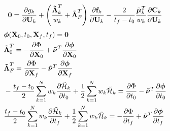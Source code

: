 \documentclass[10pt,final]{report}
\begin{document}
\begin{eqnarray}
  & \textbf{0} = \displaystyle\frac{\partial g_k}{\partial
    \textbf{U}_k} + \left(\frac{\boldsymbol{\tilde\Lambda}_k^T}{w_k} +
    \boldsymbol{\tilde \Lambda}^T_F \right)  \frac{\partial
    \textbf{f}_k}{\partial \textbf{U}_k} -
  \frac{2}{t_f-t_0}\frac{\tilde{\boldsymbol{\mu}}_{k}^T}{w_k}
  \frac{\partial \textbf{C}_{k}}{\partial \textbf{U}_k}  &
    \vspace{6pt}
\end{eqnarray}
\begin{eqnarray}
  \label{kkt 4}
  & \boldsymbol{\phi}(\textbf{X}_0,t_0,\textbf{X}_f,t_f) = \textbf{0}
  & \vspace{6pt}\\
  & \boldsymbol{\tilde \Lambda}_0^T = -\displaystyle\frac{\partial
    \Phi}{\partial \textbf{X}_0} + \boldsymbol{\tilde\nu}^T
  \displaystyle\frac{\partial \boldsymbol{\phi}}{\partial
    \textbf{X}_0} & \vspace{6pt}\\
  \label{kkt 5}
  & \boldsymbol{\tilde \Lambda}_F^T = \displaystyle\frac{\partial
    \Phi}{\partial \textbf{X}_f} - \boldsymbol{\tilde\nu}^T
  \displaystyle\frac{\partial \boldsymbol{\phi}}{\partial
    \textbf{X}_f} &\vspace{6pt}\\
  \label{kkt 6}
  & - \displaystyle\frac{t_f-t_0}{2} \sum_{k = 1}^N w_k
  \frac{\partial \tilde{\cal H}_k}{\partial t_0} + \frac{1}{2}
  \sum_{k=1}^N w_k  \tilde{\cal H}_k
  = \displaystyle\frac{\partial \Phi}{\partial t_0} -
  \boldsymbol{\tilde\nu}^T \frac{\partial
    \boldsymbol{\phi}}{\partial t_0}  &\vspace{6pt}\\
  \label{kkt 7}
  & \displaystyle\frac{t_f-t_0}{2} \sum_{k =
    1}^N w_k  \frac{\partial \tilde{\cal H}_k}{\partial t_f}
  + \frac{1}{2} \sum_{k=1}^N w_k
  \tilde{\cal H}_k = -\displaystyle\frac{\partial \Phi}{\partial
    t_f} + \boldsymbol{\tilde\nu}^T \frac{\partial
    \boldsymbol{\phi}}{\partial
    t_f}  & \vspace{6pt}
\end{eqnarray}
\end{document}
